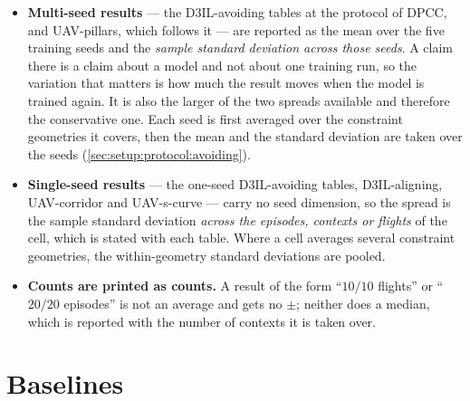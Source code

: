 \begin{itemize}
  \item \textbf{Multi-seed results} --- the D3IL-avoiding tables at the protocol of \ac{DPCC}, and
    UAV-pillars, which follows it --- are reported as the mean over the
    five training seeds and the \emph{sample standard deviation across those seeds}. A claim there is a
    claim about a model and not about one training run, so the variation that matters is how much the
    result moves when the model is trained again. It is also the larger of the two spreads available and
    therefore the conservative one. Each seed is first averaged over the constraint geometries it covers,
    then the mean and the standard deviation are taken over the seeds
    (\autoref{sec:setup:protocol:avoiding}).
  \item \textbf{Single-seed results} --- the one-seed D3IL-avoiding tables, D3IL-aligning, UAV-corridor and
    UAV-s-curve --- carry no seed dimension, so the spread is the sample standard deviation
    \emph{across the episodes, contexts or flights} of the cell, which is stated with each table. Where a
    cell averages several constraint geometries, the within-geometry standard deviations are pooled.
  \item \textbf{Counts are printed as counts.} A result of the form \enquote{$10/10$ flights} or
    \enquote{$20/20$ episodes} is not an average and gets no $\pm$; neither does a median, which is
    reported with the number of contexts it is taken over.
\end{itemize}


\section{Baselines}\label{sec:setup:baselines}

